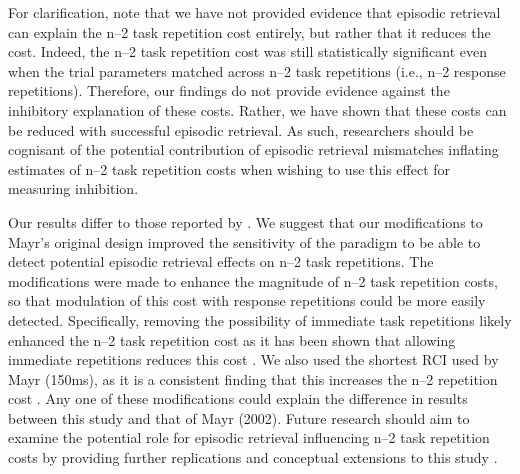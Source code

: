 \documentclass[a4paper, man, natbib]{apa6}
\begin{document}
For clarification, note that we have not provided evidence that episodic retrieval can explain the n--2 task repetition cost entirely, but rather that it reduces the cost. Indeed, the n--2 task repetition cost was still statistically significant even when the trial parameters matched across n--2 task repetitions (i.e., n--2 response repetitions). Therefore, our findings do not provide evidence against the inhibitory explanation of these costs. Rather, we have shown that these costs can be reduced with successful episodic retrieval. As such, researchers should be cognisant of the potential contribution of episodic retrieval mismatches inflating estimates of n--2 task repetition costs when wishing to use this effect for measuring inhibition.

Our results differ to those reported by \cite{Mayr2002}. We suggest that our modifications to Mayr's original design improved the sensitivity of the paradigm to be able to detect potential episodic retrieval effects on n--2 task repetitions. The modifications were made to enhance the magnitude of n--2 task repetition costs, so that modulation of this cost with response repetitions could be more easily detected. Specifically, removing the possibility of immediate task repetitions likely enhanced the n--2 task repetition cost as it has been shown that allowing immediate repetitions reduces this cost \citep{Philipp2006}. We also used the shortest RCI used by Mayr (150ms), as it is a consistent finding that this increases the n--2 repetition cost \cite{Gade2005, Grange2009, Mayr2000, Mayr2002}. Any one of these modifications could explain the difference in results between this study and that of Mayr (2002). Future research should aim to examine the potential role for episodic retrieval influencing n--2 task repetition costs by providing further replications and conceptual extensions to this study \citep{OpenScienceCollaboration2015}.






\end{document}
